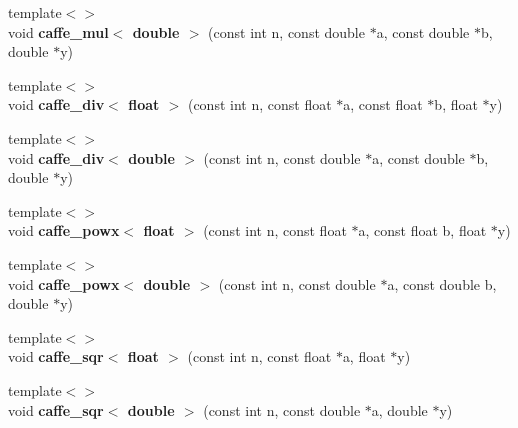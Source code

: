 \begin{DoxyCompactItemize}
\item 
{\footnotesize template$<$$>$ }\\void {\bfseries caffe\+\_\+mul$<$ double $>$} (const int n, const double $\ast$a, const double $\ast$b, double $\ast$y)\hypertarget{namespacecaffe_aa737440327ff64cf24422620fcb7b5f2}{}\label{namespacecaffe_aa737440327ff64cf24422620fcb7b5f2}

\item 
{\footnotesize template$<$$>$ }\\void {\bfseries caffe\+\_\+div$<$ float $>$} (const int n, const float $\ast$a, const float $\ast$b, float $\ast$y)\hypertarget{namespacecaffe_a5da01a3589fb3ed828d3c3ea28dca727}{}\label{namespacecaffe_a5da01a3589fb3ed828d3c3ea28dca727}

\item 
{\footnotesize template$<$$>$ }\\void {\bfseries caffe\+\_\+div$<$ double $>$} (const int n, const double $\ast$a, const double $\ast$b, double $\ast$y)\hypertarget{namespacecaffe_a6aff3d4f403573c6116ea52e0875667c}{}\label{namespacecaffe_a6aff3d4f403573c6116ea52e0875667c}

\item 
{\footnotesize template$<$$>$ }\\void {\bfseries caffe\+\_\+powx$<$ float $>$} (const int n, const float $\ast$a, const float b, float $\ast$y)\hypertarget{namespacecaffe_ac63faf91a74ed26c21995906ffc05aa4}{}\label{namespacecaffe_ac63faf91a74ed26c21995906ffc05aa4}

\item 
{\footnotesize template$<$$>$ }\\void {\bfseries caffe\+\_\+powx$<$ double $>$} (const int n, const double $\ast$a, const double b, double $\ast$y)\hypertarget{namespacecaffe_abc32d9c6721f0a864270552957c513af}{}\label{namespacecaffe_abc32d9c6721f0a864270552957c513af}

\item 
{\footnotesize template$<$$>$ }\\void {\bfseries caffe\+\_\+sqr$<$ float $>$} (const int n, const float $\ast$a, float $\ast$y)\hypertarget{namespacecaffe_add3fbffad218dec24176292a0fb2436a}{}\label{namespacecaffe_add3fbffad218dec24176292a0fb2436a}

\item 
{\footnotesize template$<$$>$ }\\void {\bfseries caffe\+\_\+sqr$<$ double $>$} (const int n, const double $\ast$a, double $\ast$y)\hypertarget{namespacecaffe_a5b56a825d8809e999548bbfe94b3bb5b}{}\label{namespacecaffe_a5b56a825d8809e999548bbfe94b3bb5b}


\end{DoxyCompactItemize}
